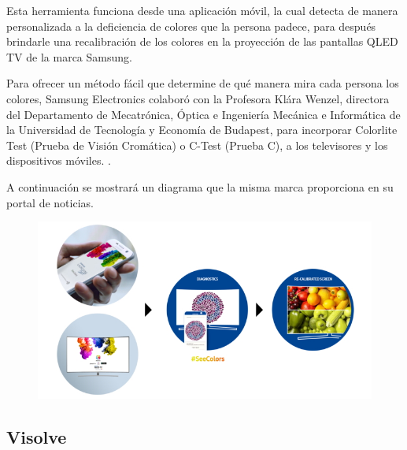 \documentclass[10pt]{article}
\begin{document}
\setlength{\parskip}{2mm}

Esta herramienta funciona desde una aplicación móvil, la cual detecta de manera personalizada a la deficiencia de colores que la persona padece, para después brindarle una recalibración de los colores en la proyección de las pantallas QLED TV de la marca Samsung\textregistered. \newline

\setlength{\parskip}{2mm}

Para ofrecer un método fácil que determine de qué manera mira cada persona los colores, Samsung Electronics colaboró con la Profesora Klára Wenzel, directora del Departamento de Mecatrónica, Óptica e Ingeniería Mecánica e Informática de la Universidad de Tecnología y Economía de Budapest, para incorporar Colorlite Test (Prueba de Visión Cromática) o C-Test (Prueba C), a los televisores y los dispositivos móviles.
\cite{IEEEreferencias:Ref3}.

\setlength{\parskip}{2mm}

A continuación se mostrará un diagrama que la misma marca proporciona en su portal de noticias. \newline

\begin{figure}[H]
	\begin{center}
\includegraphics[scale = 2.30]{Imagenes/Samsung-SeeColors-App-for-QLED-TV_main_2.jpg}
	\end{center} 
\end{figure}

\subsection{Visolve}
\end{document}
